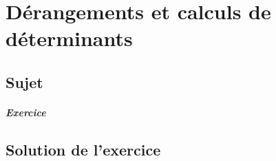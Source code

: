 \chapter{Dérangements et calculs de déterminants}

\section{Sujet}

\paragraph{Exercice}

\section{Solution de l'exercice} %

